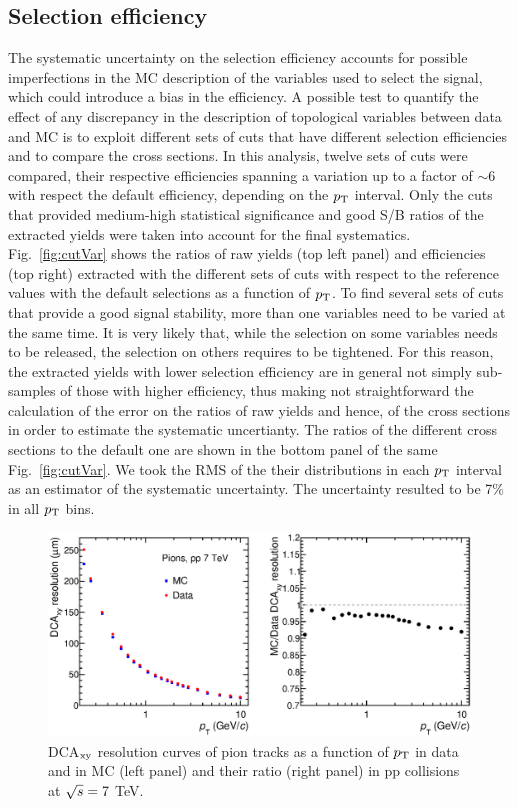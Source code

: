 \subsection{Selection efficiency}
\label{sec:CutVariation}
The systematic uncertainty on the selection efficiency accounts for 
possible imperfections in the MC description of the variables used to select the signal, 
which could introduce a bias in the efficiency. A possible test to quantify the effect of any discrepancy in the 
description of topological variables between data and MC is to exploit different sets of cuts
that have different selection efficiencies and to compare the cross sections.
In this analysis, twelve sets of cuts were compared, 
their respective efficiencies spanning a variation up to 
a factor of $\sim$6 with respect the default efficiency, depending on the $p_{\rm T}$ interval.
Only the cuts that provided 
medium-high statistical significance and good S/B ratios of the extracted yields
were taken into account for the final systematics.
Fig.~\ref{fig:cutVar} shows the ratios of raw yields (top left panel) and efficiencies (top right) 
extracted with the different sets of cuts with respect
to the reference values with the default selections as a function of $p_{\rm T}$.
To find several sets of cuts that provide a good signal stability, 
more than one variables need to be varied at the same time. It is very likely that,
while the selection on some variables needs to be released, the selection
on others requires to be tightened. For this reason, the extracted yields with lower selection efficiency are in general not simply
sub-samples of those with higher efficiency, thus making not straightforward the calculation
of the error on the ratios of raw yields and hence, of the cross sections in order to
estimate the systematic uncertianty.
The ratios of the different cross sections to the default one are shown in the bottom panel of the
same Fig.~\ref{fig:cutVar}. We took the RMS of the their distributions in each $p_{\rm T}$ interval as an estimator of 
the systematic uncertainty. The uncertainty resulted to be 7\% in all $p_{\rm T}$ bins.
\begin{figure}[!h]
\begin{center}
 \includegraphics[width=1\textwidth]{FigCap4/DCAxyReso_Pions.eps}
\caption{DCA$_{\rm xy}$ resolution curves of pion tracks as a function of $p_{\rm T}$ in data and in MC (left panel) and their ratio (right panel) in pp collisions at $\sqrt{s} = 7 $ TeV.}             
\label{fig:DCAxyReso}
\end{center}
\end{figure}
